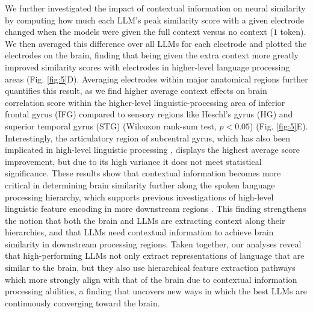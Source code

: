 We further investigated the impact of contextual information on neural similarity by computing how much each LLM's peak similarity score with a given electrode changed when the models were given the full context versus no context ($1$ token). 
We then averaged this difference over all LLMs for each electrode and plotted the electrodes on the brain, finding that being given the extra context more greatly improved similarity scores with electrodes in higher-level language processing areas (Fig. \ref{fig:5}D). Averaging electrodes within major anatomical regions further quantifies this result, as we find higher average context effects on brain correlation score within the higher-level linguistic-processing area of inferior frontal gyrus (IFG) \cite{costafreda2006systematic} compared to sensory regions like Heschl's gyrus (HG) and superior temporal gyrus (STG) (Wilcoxon rank-sum test, $p<0.05$) (Fig. \ref{fig:5}E). Interestingly, the articulatory region of subcentral gyrus, which has also been implicated in high-level linguistic processing \cite{arana2020sensory}, displays the highest average score improvement, but due to its high variance it does not meet statistical significance.
These results show that contextual information becomes more critical in determining brain similarity further along the spoken language processing hierarchy, which supports previous investigations of high-level linguistic feature encoding in more downstream regions \cite{sheng2019cortical, keshishian2023joint}. 
This finding strengthens the notion that both the brain and LLMs are extracting context along their hierarchies, and that LLMs need contextual information to achieve brain similarity in downstream processing regions. Taken together, our analyses reveal that high-performing LLMs not only extract representations of language that are similar to the brain, but they also use hierarchical feature extraction pathways which more strongly align with that of the brain due to contextual information processing abilities, a finding that uncovers new ways in which the best LLMs are continuously converging toward the brain.
